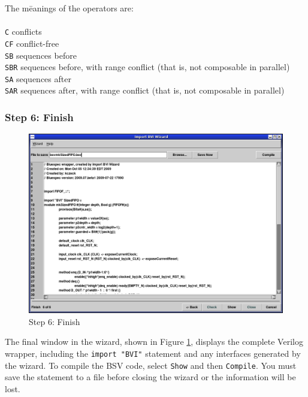 \documentclass{article}
\newcommand{\te}[1]{\texttt{#1}}
\begin{document}
\begin{tabbing}
The m\=eanings of \= the operators are: \\
\\
\>\texttt{C} \>       conflicts \\
\>\texttt{CF} \>      conflict-free \\
\>\texttt{SB} \>     sequences before \\
\>\texttt{SBR} \>     sequences before, with range conflict (that is,
not  composable in parallel) \\
\>\texttt{SA} \>     sequences after \\
\>\texttt{SAR} \>     sequences after, with range conflict (that is,
not  composable in parallel) \\
\end{tabbing}


\subsubsection{Step 6: Finish}

\begin{figure}[htbp]
\begin{center}
\includegraphics[width = 4 in]{figures/importbvi6}
\caption{Step 6: Finish }
\label{fig-importbvi6}
\end{center}
\end{figure}

The final window in the wizard, shown in Figure \ref{fig-importbvi6},  displays the  complete Verilog wrapper, including
the \te{import "BVI"} statement and any interfaces generated by the
wizard.  To compile the BSV code, select \te{Show} and then
\te{Compile}.   You must save the statement to a
file before closing the wizard or the information will be lost.
\end{document}
